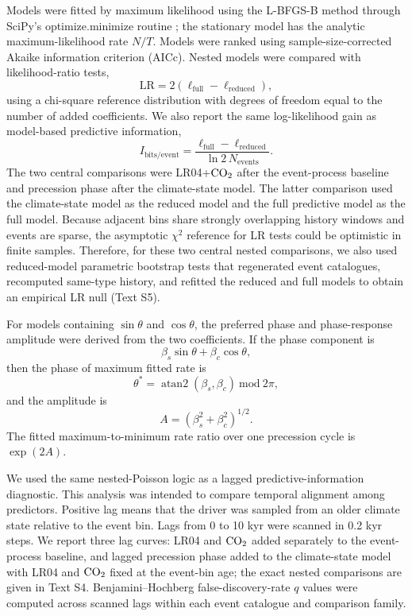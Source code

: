 \documentclass[11pt]{article}
\begin{document}
Models were fitted by maximum likelihood using the L-BFGS-B method through SciPy's optimize.minimize routine \citep{virtanen2020scipy}; the stationary model has the analytic maximum-likelihood rate \(N/T\). Models were ranked using sample-size-corrected Akaike information criterion (AICc). Nested models were compared with likelihood-ratio tests,
\[
\mathrm{LR}=2(\ell_\mathrm{full}-\ell_\mathrm{reduced}),
\]
using a chi-square reference distribution with degrees of freedom equal to the number of added coefficients. We also report the same log-likelihood gain as model-based predictive information,
\[
I_{\mathrm{bits/event}}
=
\frac{\ell_\mathrm{full}-\ell_\mathrm{reduced}}
{\ln 2\,N_{\mathrm{events}}}.
\]
The two central comparisons were LR04+\(\ce{CO2}\) after the event-process baseline and precession phase after the climate-state model. The latter comparison used the climate-state model as the reduced model and the full predictive model as the full model. Because adjacent bins share strongly overlapping history windows and events are sparse, the asymptotic \(\chi^2\) reference for LR tests could be optimistic in finite samples. Therefore, for these two central nested comparisons, we also used reduced-model parametric bootstrap tests that regenerated event catalogues, recomputed same-type history, and refitted the reduced and full models to obtain an empirical LR null (Text S5).

For models containing \(\sin\theta\) and \(\cos\theta\), the preferred phase and phase-response amplitude were derived from the two coefficients. If the phase component is
\[
\beta_s\sin\theta+\beta_c\cos\theta,
\]
then the phase of maximum fitted rate is
\[
\theta^\ast=\operatorname{atan2}(\beta_s,\beta_c)\ \mathrm{mod}\ 2\pi,
\]
and the amplitude is
\[
A=(\beta_s^2+\beta_c^2)^{1/2}.
\]
The fitted maximum-to-minimum rate ratio over one precession cycle is \(\exp(2A)\).

We used the same nested-Poisson logic as a lagged predictive-information diagnostic. This analysis was intended to compare temporal alignment among predictors. Positive lag means that the driver was sampled from an older climate state relative to the event bin. Lags from 0 to 10 kyr were scanned in 0.2 kyr steps. We report three lag curves: LR04 and \(\ce{CO2}\) added separately to the event-process baseline, and lagged precession phase added to the climate-state model with LR04 and \(\ce{CO2}\) fixed at the event-bin age; the exact nested comparisons are given in Text S4. Benjamini--Hochberg false-discovery-rate \(q\) values were computed across scanned lags within each event catalogue and comparison family.
\end{document}
